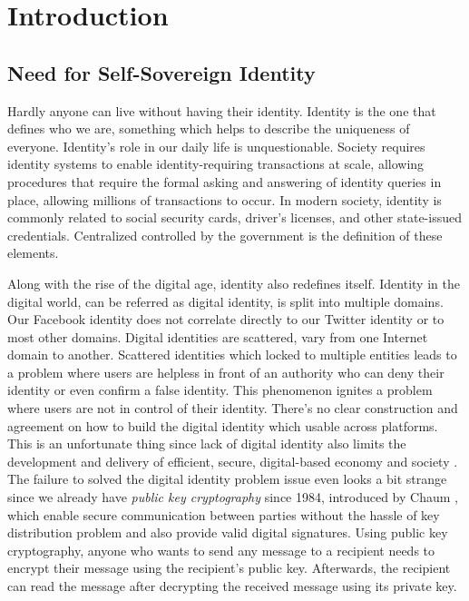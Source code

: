 \chapter{Introduction}

\section{Need for Self-Sovereign Identity}
Hardly anyone can live without having their identity. Identity is the one that defines who we are, something which helps to describe the uniqueness of everyone.
Identity's role in our daily life is unquestionable. Society requires identity systems to enable identity-requiring transactions at scale, allowing procedures that require the formal asking and answering of identity queries in place, allowing millions of transactions to occur.
In modern society, identity is commonly related to social security cards, driver's licenses, and other state-issued credentials. Centralized controlled by the government is the definition of these elements.

Along with the rise of the digital age, identity also redefines itself. Identity in the digital world, can be referred as digital identity, is split into multiple domains. Our Facebook identity does not correlate directly to our Twitter identity or to most other domains. Digital identities are scattered, vary from one Internet domain to another. Scattered identities which locked to multiple entities leads to a problem where users are helpless in front of an authority who can deny their identity or even confirm a false identity. This phenomenon ignites a problem where users are not in control of their identity.
There's no clear construction and agreement on how to build the digital identity which usable across platforms. This is an unfortunate thing since lack of digital identity also limits the development and delivery of efficient, secure, digital-based economy and society \cite{blueprint}. The failure to solved the digital identity problem issue even looks a bit strange since we already have \textit{public key cryptography} since 1984, introduced by Chaum \cite{chaum}, which enable secure communication between parties without the hassle of key distribution problem and also provide valid digital signatures. Using public key cryptography, anyone who wants to send any message to a recipient needs to encrypt their message using the recipient's public key. Afterwards, the recipient can read the message after decrypting the received message using its private key.

